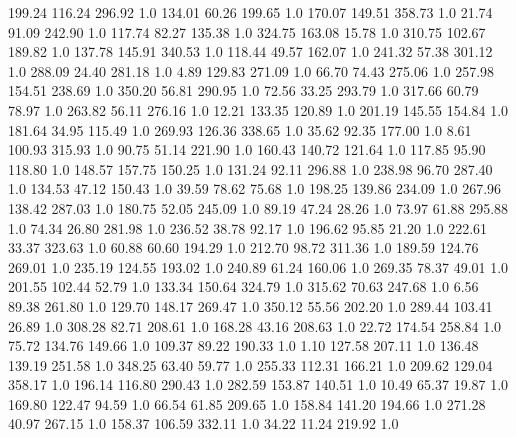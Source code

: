     199.24    116.24    296.92  1.0
    134.01     60.26    199.65  1.0
    170.07    149.51    358.73  1.0
     21.74     91.09    242.90  1.0
    117.74     82.27    135.38  1.0
    324.75    163.08     15.78  1.0
    310.75    102.67    189.82  1.0
    137.78    145.91    340.53  1.0
    118.44     49.57    162.07  1.0
    241.32     57.38    301.12  1.0
    288.09     24.40    281.18  1.0
      4.89    129.83    271.09  1.0
     66.70     74.43    275.06  1.0
    257.98    154.51    238.69  1.0
    350.20     56.81    290.95  1.0
     72.56     33.25    293.79  1.0
    317.66     60.79     78.97  1.0
    263.82     56.11    276.16  1.0
     12.21    133.35    120.89  1.0
    201.19    145.55    154.84  1.0
    181.64     34.95    115.49  1.0
    269.93    126.36    338.65  1.0
     35.62     92.35    177.00  1.0
      8.61    100.93    315.93  1.0
     90.75     51.14    221.90  1.0
    160.43    140.72    121.64  1.0
    117.85     95.90    118.80  1.0
    148.57    157.75    150.25  1.0
    131.24     92.11    296.88  1.0
    238.98     96.70    287.40  1.0
    134.53     47.12    150.43  1.0
     39.59     78.62     75.68  1.0
    198.25    139.86    234.09  1.0
    267.96    138.42    287.03  1.0
    180.75     52.05    245.09  1.0
     89.19     47.24     28.26  1.0
     73.97     61.88    295.88  1.0
     74.34     26.80    281.98  1.0
    236.52     38.78     92.17  1.0
    196.62     95.85     21.20  1.0
    222.61     33.37    323.63  1.0
     60.88     60.60    194.29  1.0
    212.70     98.72    311.36  1.0
    189.59    124.76    269.01  1.0
    235.19    124.55    193.02  1.0
    240.89     61.24    160.06  1.0
    269.35     78.37     49.01  1.0
    201.55    102.44     52.79  1.0
    133.34    150.64    324.79  1.0
    315.62     70.63    247.68  1.0
      6.56     89.38    261.80  1.0
    129.70    148.17    269.47  1.0
    350.12     55.56    202.20  1.0
    289.44    103.41     26.89  1.0
    308.28     82.71    208.61  1.0
    168.28     43.16    208.63  1.0
     22.72    174.54    258.84  1.0
     75.72    134.76    149.66  1.0
    109.37     89.22    190.33  1.0
      1.10    127.58    207.11  1.0
    136.48    139.19    251.58  1.0
    348.25     63.40     59.77  1.0
    255.33    112.31    166.21  1.0
    209.62    129.04    358.17  1.0
    196.14    116.80    290.43  1.0
    282.59    153.87    140.51  1.0
     10.49     65.37     19.87  1.0
    169.80    122.47     94.59  1.0
     66.54     61.85    209.65  1.0
    158.84    141.20    194.66  1.0
    271.28     40.97    267.15  1.0
    158.37    106.59    332.11  1.0
     34.22     11.24    219.92  1.0
